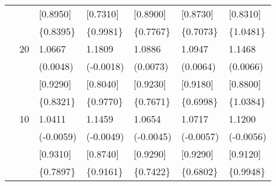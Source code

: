 \begin{table}[ht]
\begin{tabular}{lllllll}
&&[0.8950]&[0.7310]&[0.8900]&[0.8730]&[0.8310]\\
&&\{0.8395\}&\{0.9981\}&\{0.7767\}&\{0.7073\}&\{1.0481\}\\
&20&1.0667&1.1809&1.0886&1.0947&1.1468\\
&&(0.0048)&(-0.0018)&(0.0073)&(0.0064)&(0.0066)\\
&&[0.9290]&[0.8040]&[0.9230]&[0.9180]&[0.8800]\\
&&\{0.8321\}&\{0.9770\}&\{0.7671\}&\{0.6998\}&\{1.0384\}\\
&10&1.0411&1.1459&1.0654&1.0717&1.1200\\
&&(-0.0059)&(-0.0049)&(-0.0045)&(-0.0057)&(-0.0056)\\
&&[0.9310]&[0.8740]&[0.9290]&[0.9290]&[0.9120]\\
&&\{0.7897\}&\{0.9161\}&\{0.7422\}&\{0.6802\}&\{0.9948\}\\
\hline
\end{tabular}
\end{table}

